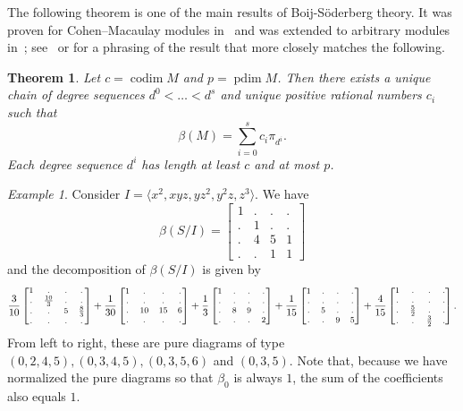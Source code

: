 \documentclass[12pt]{amsart}
\newtheorem{thm}[lemma]{Theorem}
\theoremstyle{remark}
\newtheorem{example}[lemma]{Example}
\newcommand{\pdim}{\operatorname{pdim}}
\newcommand{\codim}{\operatorname{codim}}
\begin{document}
The following theorem is one of the main results of Boij-S\"oderberg theory.  It was proven for Cohen--Macaulay modules in~\cite{eis-schrey1} and was extended to arbitrary modules in~\cite{boij-sod2};  see~\cite[Theorem~5.1]{floystad} or \cite[Theorem~2.1]{erman-beh} for a phrasing of the result that more closely matches the following.
\begin{thm}\label{thm:mainBS}
Let $c=\codim M$ and $p=\pdim M$.  Then there exists a unique chain of degree sequences  $d^0< \dots <d^s$ and unique positive rational numbers $c_i$ such that
	\[
	\beta(M)=\sum_{i=0}^s c_i\pi_{d^i}.
	\]
Each degree sequence $d^i$ has length at least $c$ and at most $p$.
\end{thm}
\begin{example}\label{ex:BoijSodDecomposition}
Consider $I=\langle x^2,xyz,yz^2,y^2z,z^3 \rangle$.  We have
\[
\beta(S/I) = \begin{bmatrix}
1 & . & . & .\\
  . & 1 & . & .\\
 . & 4 & 5 & 1\\
  . & . & 1 & 1
      \end{bmatrix}
\]
and the decomposition of $\beta(S/I)$ is given by
\[
\begin{footnotesize}
\frac{3}{10} 
\begin{bmatrix}
1& . & . & .\\
 . & \frac{10}{3} & . & .\\
 . & . & 5 & \frac{8}{3}\\
  . & . & . & .
 \end{bmatrix}
 +
 \frac{1}{30} 
\begin{bmatrix}
1& . & . & .\\
 . & . & . & .\\
 . & 10 & 15 & 6\\
  . & . & . & .
 \end{bmatrix}
 +
 \frac{1}{3} 
\begin{bmatrix}
1& . & . & .\\
 . & . & .  & .\\
 . & 8 & 9 & .\\
  . & . & . & 2
 \end{bmatrix}
 +
  \frac{1}{15} 
\begin{bmatrix}
1& . & . & .\\
 . & . & .  & .\\
 . & 5 & . & .\\
  . & . & 9 & 5
 \end{bmatrix}
 +
   \frac{4}{15} 
\begin{bmatrix}
1& . & . & .\\
 . & . & .  & .\\
 . & \frac{5}{2} & . & .\\
  . & . & \frac{3}{2} & .
 \end{bmatrix}.
      \end{footnotesize}
\]
From left to right, these are pure diagrams of type $(0,2,4,5), (0,3,4,5), (0,3,5,6)$ and $(0,3,5)$.  Note that, because we have normalized the pure diagrams so that $\beta_0$ is always $1$, the sum of the coefficients also equals $1$.
\end{example}
\end{document}

